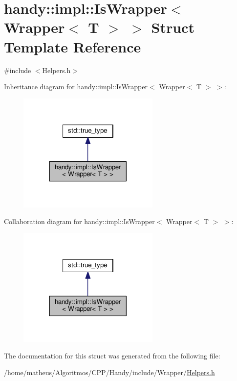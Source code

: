 \hypertarget{structhandy_1_1impl_1_1IsWrapper_3_01Wrapper_3_01T_01_4_01_4}{}\section{handy\+:\+:impl\+:\+:Is\+Wrapper$<$ Wrapper$<$ T $>$ $>$ Struct Template Reference}
\label{structhandy_1_1impl_1_1IsWrapper_3_01Wrapper_3_01T_01_4_01_4}


{\ttfamily \#include $<$Helpers.\+h$>$}



Inheritance diagram for handy\+:\+:impl\+:\+:Is\+Wrapper$<$ Wrapper$<$ T $>$ $>$\+:\nopagebreak
\begin{figure}[H]
\begin{center}
\leavevmode
\includegraphics[width=198pt]{structhandy_1_1impl_1_1IsWrapper_3_01Wrapper_3_01T_01_4_01_4__inherit__graph}
\end{center}
\end{figure}


Collaboration diagram for handy\+:\+:impl\+:\+:Is\+Wrapper$<$ Wrapper$<$ T $>$ $>$\+:\nopagebreak
\begin{figure}[H]
\begin{center}
\leavevmode
\includegraphics[width=198pt]{structhandy_1_1impl_1_1IsWrapper_3_01Wrapper_3_01T_01_4_01_4__coll__graph}
\end{center}
\end{figure}


The documentation for this struct was generated from the following file\+:\begin{DoxyCompactItemize}
\item 
/home/matheus/\+Algoritmos/\+C\+P\+P/\+Handy/include/\+Wrapper/\hyperlink{Wrapper_2Helpers_8h}{Helpers.\+h}\end{DoxyCompactItemize}
